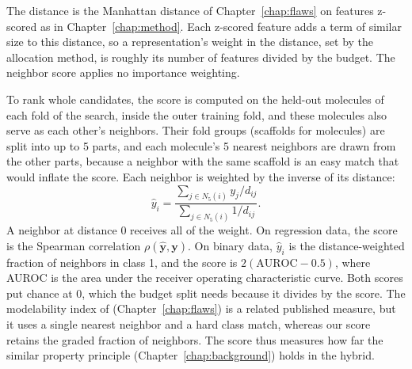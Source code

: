 The distance is the Manhattan distance of Chapter~\ref{chap:flaws} on features z-scored as in Chapter~\ref{chap:method}. Each z-scored feature adds a term of similar size to this distance, so a representation's weight in the distance, set by the allocation method, is roughly its number of features divided by the budget. The neighbor score applies no importance weighting.

To rank whole candidates, the score is computed on the held-out molecules of each fold of the search, inside the outer training fold, and these molecules also serve as each other's neighbors. Their fold groups (scaffolds for molecules) are split into up to 5 parts, and each molecule's 5 nearest neighbors are drawn from the other parts, because a neighbor with the same scaffold is an easy match that would inflate the score. Each neighbor is weighted by the inverse of its distance:
\begin{equation}
\hat{y}_i = \frac{\sum_{j\in N_5(i)} y_j / d_{ij}}{\sum_{j\in N_5(i)} 1/d_{ij}}.
\end{equation}
A neighbor at distance 0 receives all of the weight. On regression data, the score is the Spearman correlation $\rho(\hat{\mathbf{y}}, \mathbf{y})$. On binary data, $\hat{y}_i$ is the distance-weighted fraction of neighbors in class 1, and the score is $2(\mathrm{AUROC} - 0.5)$, where AUROC is the area under the receiver operating characteristic curve. Both scores put chance at 0, which the budget split needs because it divides by the score. The modelability index of \citet{Golbraikh2014} (Chapter~\ref{chap:flaws}) is a related published measure, but it uses a single nearest neighbor and a hard class match, whereas our score retains the graded fraction of neighbors. The score thus measures how far the similar property principle (Chapter~\ref{chap:background}) holds in the hybrid.

